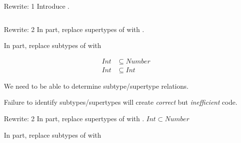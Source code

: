 \begin{frame}{Rewrite: 1}
  Introduce .

  \begin{columns}
    \begin{column}{0.5\textwidth}
      \usebox\typecaseAbox
    \end{column}
    \begin{column}{0.5\textwidth}  %
      \usebox\typecaseBbox
    \end{column}    
  \end{columns}
\end{frame}



\begin{frame}{Rewrite: 2}
  In  part, replace supertypes of  with . 

  In  part, replace subtypes of  with 

  \begin{align*}
    Int&\subseteq Number\\
    Int&\subseteq Int
  \end{align*}

  We need to be able to determine subtype/supertype relations.

  Failure to identify subtypes/supertypes will create \emph{correct} but \emph{inefficient} code.
\end{frame}



\begin{frame}{Rewrite: 2}
  In  part, replace supertypes of  with .  $Int\subset Number$
  
  In  part, replace subtypes of  with 

  \begin{columns}
    \begin{column}{0.5\textwidth}
      \usebox\typecaseBbox
    \end{column}
    \begin{column}{0.5\textwidth}  %
      \usebox\typecaseChbox
    \end{column}    
  \end{columns}
\end{frame}



